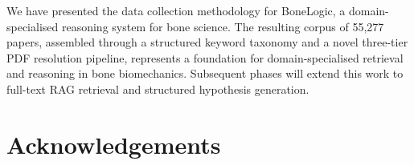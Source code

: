 \documentclass[12pt, a4paper]{article}
\begin{document}
We have presented the data collection methodology for BoneLogic, a domain-specialised
reasoning system for bone science. The resulting corpus of 55,277 papers, assembled
through a structured keyword taxonomy and a novel three-tier PDF resolution pipeline,
represents a foundation for domain-specialised retrieval and reasoning in bone biomechanics.
Subsequent phases will extend this work to full-text RAG retrieval and structured
hypothesis generation.

\section*{Acknowledgements}



\end{document}
